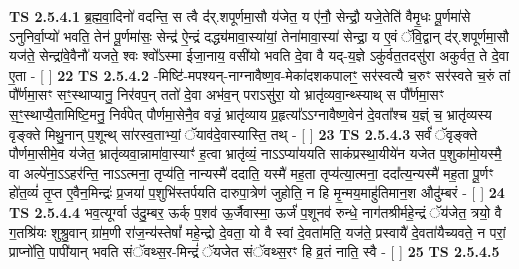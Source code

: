 \documentclass[17pt]{extarticle}
\begin{document}
                                        \textbf{ TS 2.5.4.1} \newline
                  ब्र॒ह्म॒वा॒दिनो॑ वदन्ति॒ स त्वै द॑॑र्.शपूर्णमा॒सौ य॑जेत॒ य ए॑नौ॒ सेन्द्रौ॒ यजे॒तेति॑ वैमृ॒धः पू॒र्णमा॑से ऽनुनिर्वा॒प्यो॑ भवति॒ तेन॑ पू॒र्णमा॑सः॒ सेन्द्र॑ ऐ॒न्द्रं दद्ध्य॑मावा॒स्या॑यां॒ तेना॑मावा॒स्या॑ सेन्द्रा॒ य ए॒वं ॅवि॒द्वान् द॑र्.शपूर्णमा॒सौ यज॑ते॒ सेन्द्रा॑वे॒वैनौ॑ यजते॒ श्वः श्वो᳚ऽस्मा ईजा॒नाय॒ वसी॑यो भवति दे॒वा वै यद्-य॒ज्ञे ऽकु॑र्वत॒तदसु॑रा अकुर्वत॒ ते दे॒वा ए॒ता - [  ] \textbf{  22} \newline
                  \newline
                                \textbf{ TS 2.5.4.2} \newline
                  -मिष्टि॑-मपश्यन्-नाग्नावैष्ण॒व-मेका॑दशकपालꣳ॒॒ सर॑स्वत्यै च॒रुꣳ सर॑स्वते च॒रुं तां पौ᳚र्णमा॒सꣳ सꣳ॒॒स्थाप्यानु॒ निर॑वप॒न् ततो॑ दे॒वा अभ॑व॒न् पराऽसु॑रा॒ यो भ्रातृ॑व्यवा॒न्थ्स्याथ् स पौ᳚र्णमा॒सꣳ स॒ꣳ॒॒स्थाप्यै॒तामिष्टि॒मनु॒ निर्व॑पेत् पौर्णमा॒सेनै॒व वज्रं॒ भ्रातृ॑व्याय प्र॒हृत्या᳚ऽऽग्नावैष्ण॒वेन॑ दे॒वता᳚श्च य॒ज्ञ्ं च॒ भ्रातृ॑व्यस्य वृङ्क्ते मिथु॒नान् प॒शून्थ् सा॑रस्व॒ताभ्यां॒ ॅयाव॑दे॒वास्यास्ति॒ तथ् - [  ] \textbf{  23} \newline
                  \newline
                                \textbf{ TS 2.5.4.3} \newline
                  सर्वं॑ ॅवृङ्क्ते पौर्णमा॒सीमे॒व य॑जेत॒ भ्रातृ॑व्यवा॒न्नामा॑वा॒स्याꣳ॑ ह॒त्वा भ्रातृ॑व्यं॒ नाऽऽप्या॑ययति साकंप्रस्था॒यीये॑न यजेत प॒शुका॑मो॒यस्मै॒ वा अल्पे॑ना॒ऽऽहर॑न्ति॒ नाऽऽत्मना॒ तृप्य॑ति॒ नान्यस्मै॑ ददाति॒ यस्मै॑ मह॒ता तृप्य॑त्या॒त्मना॒ ददा᳚त्य॒न्यस्मै॑ मह॒ता पू॒र्णꣳ हो॑त॒व्यं॑ तृ॒प्त ए॒वैन॒मिन्द्रः॑ प्र॒जया॑ प॒शुभि॑स्तर्पयति दारुपा॒त्रेण॑ जुहोति॒ न हि मृ॒न्मय॒माहु॑तिमान॒श औदु॑म्बरं - [  ] \textbf{  24} \newline
                  \newline
                                \textbf{ TS 2.5.4.4} \newline
                  भव॒त्यूर्ग्वा उ॑दु॒म्बर॒ ऊर्क् प॒शव॑ ऊ॒र्जैवास्मा॒ ऊर्जं॑ प॒शूनव॑ रुन्धे॒ नाग॑तश्रीर्महे॒न्द्रं ॅय॑जेत॒ त्रयो॒ वै ग॒तश्रि॑यः शुश्रु॒वान् ग्रा॑म॒णी रा॑ज॒न्य॑स्तेषां᳚ महे॒न्द्रो दे॒वता॒ यो वै स्वां दे॒वता॑मति॒ यज॑ते॒ प्रस्वायै॑ दे॒वता॑यैच्यवते॒ न परां॒ प्राप्नो॑ति॒ पापी॑यान् भवति संॅवथ्स॒र-मिन्द्रं॑ ॅयजेत संॅवथ्स॒रꣳ हि व्र॒तं नाति॒ स्वै - [  ] \textbf{  25} \newline
                  \newline
                                \textbf{ TS 2.5.4.5} \newline
\end{document}
